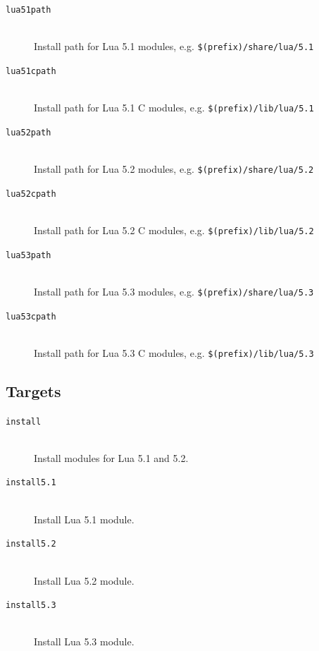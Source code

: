 \documentclass[11pt, oneside]{memoir}
\begin{document}
\begin{description}

\item[\texttt{lua51path}]  \hfill \\
Install path for Lua 5.1 modules, e.g. \texttt{\$(prefix)/share/lua/5.1}

\item[\texttt{lua51cpath}]  \hfill \\
Install path for Lua 5.1 C modules, e.g. \texttt{\$(prefix)/lib/lua/5.1}

\item[\texttt{lua52path}]  \hfill \\
Install path for Lua 5.2 modules, e.g. \texttt{\$(prefix)/share/lua/5.2}

\item[\texttt{lua52cpath}]  \hfill \\
Install path for Lua 5.2 C modules, e.g. \texttt{\$(prefix)/lib/lua/5.2}

\item[\texttt{lua53path}]  \hfill \\
Install path for Lua 5.3 modules, e.g. \texttt{\$(prefix)/share/lua/5.3}

\item[\texttt{lua53cpath}]  \hfill \\
Install path for Lua 5.3 C modules, e.g. \texttt{\$(prefix)/lib/lua/5.3}

\end{description}

\subsection{Targets}

\begin{description}

\item[\texttt{install}] \hfill \\
Install modules for Lua 5.1 and 5.2.

\item[\texttt{install5.1}] \hfill \\
Install Lua 5.1 module.

\item[\texttt{install5.2}] \hfill \\
Install Lua 5.2 module.

\item[\texttt{install5.3}] \hfill \\
Install Lua 5.3 module.

\end{description}
\end{document}
